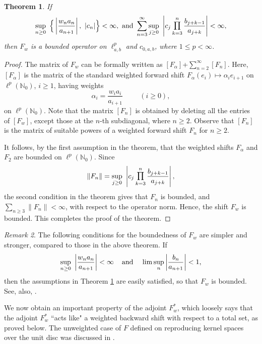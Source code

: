 \documentclass[12pt, reqno]{amsart}
\DeclareMathOperator*{\Mprod}{\text{\raisebox{0.25ex}{\scalebox{0.8}{$\prod$}}}}
\newtheorem{theorem}{Theorem}[section]
\theoremstyle{definition}
\theoremstyle{remark}
\newtheorem{remark}[theorem]{Remark}
\numberwithin{equation}{section}
\begin{document}
\begin{theorem}\label{decomposition}
   If 
   \[
 \sup_{n\geq 0}~\Big\{\left\lvert\frac{w_{n}a_{n}}{a_{n+1}}\right\rvert,~|c_n|\Big\}<\infty,~ \text{and}~
 \sum_{n=3}^{\infty}\sup_{j\geq 0} ~\left|c_j\Mprod_{k=3}^{n}\frac{ b_{j+k-1}}{a_{j+k}}\right|<\infty,
   \]
   then $F_{w}$ is a bounded operator on $\ell^{p}_{a,b}$ and $c_{0,a,b}$, where $1\leq p<\infty$.
   \end{theorem}
   \begin{proof}
The matrix of $F_w$ can be formally written as  $[F_{\alpha}]$+$\sum_{n=2}^{\infty} [F_{n}]$. Here, $[F_{\alpha}]$ is the matrix of the standard weighted forward shift $F_{\alpha}(e_i)\mapsto \alpha_i e_{i+1}$ on $\ell^p(\mathbb{N}_{0})$, $i\geq 1$, having weights 
\[
\alpha_i=\frac{ w_{i}a_i}{a_{i+1}} \hspace{1cm} (i\geq 0),
\]
on $\ell^p(\mathbb{N}_{0})$. Note that the matrix $[F_n]$ is obtained by deleting all the entries of $[F_{w}]$, except those at the $n$-th subdiagonal, where $n\geq 2$. Observe that $[F_n]$ is the matrix of suitable powers of a weighted forward shift $F_n$ for $n\geq 2$.

It follows, by the first assumption in the theorem, that the weighted shifts $F_{\alpha}$ and  $F_{2}$ are bounded on $\ell^p(\mathbb{N}_{0})$. Since
\[
\|F_n\|=\sup_{j\geq 0} ~\left|c_j\Mprod_{k=3}^{n}\frac{ b_{j+k-1}}{a_{j+k}}\right|,
\]
the second condition in the theorem gives that $F_n$ is bounded, and $\sum_{n\geq 3}\|F_n\|<\infty$, with respect to the operator norm. Hence, the shift $F_{w}$ is bounded. This completes the proof of the theorem.
\end{proof}
\begin{remark}
    The following conditions for the boundedness of $F_w$ are simpler and stronger, compared to those in the above theorem. If
\begin{equation}\label{sup-limsup}
\sup_{n\geq 0}~\left\lvert\frac{ w_{n}a_{n}}{a_{n+1}}\right\rvert<\infty \hspace{.4cm} \text{and} \hspace{.4cm} \lim \sup_{n}\left \lvert \frac{b_{n}}{a_{n+1}}\right \rvert<1,
\end{equation}
then the assumptions in Theorem \ref{decomposition} are easily satisfied, so that $F_w$ is bounded. See, also, \cite{Adams-McGuire}.
\end{remark}

We now obtain an important property of the adjoint $F_w^*$, which loosely says that the adjoint $F_w^*$ ``acts like" a weighted backward shift with respect to a total set, as proved below. The unweighted case of $F$ defined on reproducing kernel spaces over the unit disc was discussed in \cite{Mundayadan-Sarkar}.
\end{document}
